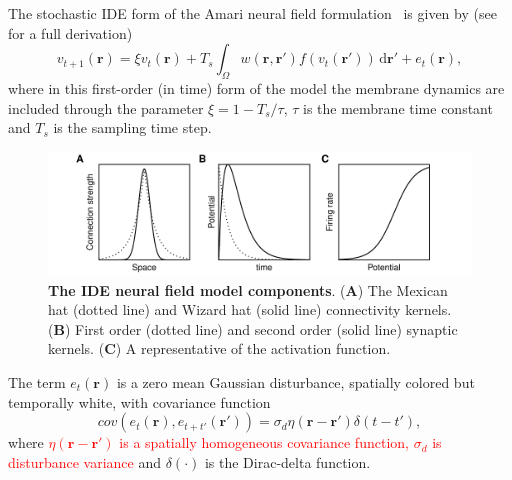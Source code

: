 \documentclass[review,authoryear,3p]{elsarticle}
\newcommand{\parham}[1]{\textcolor{red}{#1}}
\begin{document}
The stochastic IDE form of the Amari neural field formulation~\cite{Amari1977} is given by (see~\cite{Freestone2011} for a full derivation)
\begin{equation}\label{eq:DiscreteTimeModel}
	v_{t+1}\left(\mathbf{r}\right) = 
	\xi v_t\left(\mathbf{r}\right) + 
	T_s \int_\Omega { 
	    w\left(\mathbf{r},\mathbf{r'}\right)
	    f\left(v_t\left(\mathbf{r}'\right)\right) 
	\, \mathrm{d}\mathbf{r}'} 
	+ e_t\left(\mathbf{r}\right), 
\end{equation}
where in this first-order (in time) form of the model the membrane dynamics are included through the parameter $\xi=1-T_s/\tau$, $\tau$ is the membrane time constant and $T_s$ is the sampling time step. 
\begin{figure}[!t]
\centering
\includegraphics[scale=1]{./Graph/fig2.pdf}
\caption{ {\bf The IDE neural field model components}. (\textbf{A}) The Mexican hat (dotted line) and Wizard hat (solid line) connectivity kernels. (\textbf{B}) First order (dotted line) and second order (solid line) synaptic kernels. (\textbf{C}) A representative of the activation function.}
\label{fig:Modelcomponents}
\end{figure}
The term $e_t(\mathbf r)$ is a zero mean Gaussian disturbance, spatially colored but temporally white, with covariance function 
\begin{equation}
cov\left(e_{t}\left(\mathbf{r}\right),e_{t+t'}\left(\mathbf{r'}\right)\right)=\sigma_d\eta(\mathbf{r}-\mathbf{r'})\delta(t-t'),
\label{eq:FieldDisturbance}
\end{equation}
where \parham{$\eta(\mathbf{r}-\mathbf{r'})$ is a spatially homogeneous covariance function, $\sigma_d$ is disturbance variance} and $\delta(\cdot)$ is the Dirac-delta function. %
\end{document}
